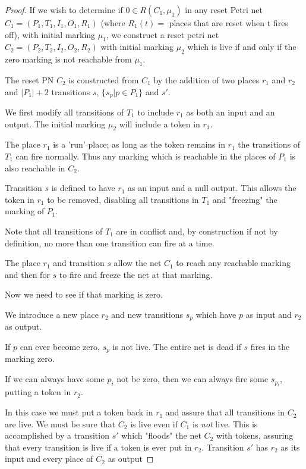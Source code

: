 \begin{proof}
If we wish to determine if $0 \in R(C_1, \mu_1)$ in any
reset Petri net $C_1 = (P_1, T_1, I_1, O_1, R_1 )$ (where $R_1(t) =$ places that are reset when t fires off), with initial marking $\mu_1$, we construct a
reset petri net $C_2 = (P_2, T_2, I_2, O_2, R_2 )$ with initial marking
$\mu_2$ which is live if and only if the zero marking is not reachable from $\mu_1$.

The reset PN $C_2$ is constructed from $C_1$ by the addition of two places $r_1$ and $r_2$
and $|P_1| +2$ transitions $s$, $\{ s_p | p \in P_1 \}$ and $s'$.

We first modify all transitions of $T_1$ to include $r_1$ as both an input and an output.
The initial marking $\mu_2$ will include a token in $r_1$. 


The place $r_1$ is a 'run' place; as long as the token remains in $r_1$ the transitions of $T_1$ can fire normally.
Thus any marking which is reachable in the places of $P_1$ is also reachable in $C_2$.



Transition $s$ is defined to have $r_1$ as an input and a null output.
This allows the token in $r_1$ to be removed, disabling all transitions in $T_1$
and "freezing" the marking of $P_1$.

Note that all transitions of $T_1$ are in conflict and, by construction if not by definition, no more than one transition can fire at a time.

The place $r_1$ and transition $s$ allow the net $C_1$ to reach any reachable marking and then for $s$ to fire and freeze the net at that marking.

Now we need to see if that marking is zero.

We introduce a new place $r_2$ and new transitions $s_p$ which have $p$ as input and $r_2$ as output.

If $p$ can ever become zero, $s_p$ is not live. The entire net is dead if
$s$ fires in the marking zero.

If we can always have some $p_i$ not be zero, then we can always fire some $s_{p_i}$, putting a token in $r_2$.

In this case we must put a token back in $r_1$ and assure that all transitions in $C_2$ are live.
We must be sure that $C_2$ is live even if $C_1$ is {\em not} live.
This is accomplished by a transition $s'$ which  "floods" the net $C_2$ with tokens, assuring that every transition is live if a token is ever put in $r_2$.
Transition $s'$ has $r_2$ as its input and every place of $C_2$ as output


\end{proof}
